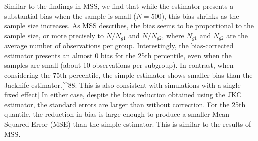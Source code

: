 \documentclass[
  authoryear,
  review,
  1p]{elsarticle}
\begin{document}
Similar to the findings in MSS, we find that while the estimator
presents a substantial bias when the sample is small (\(N=500\)), this
bias shrinks as the sample size increases. As MSS describes, the bias
seems to be proportional to the sample size, or more precisely to
\(N/N_{g1}\) and \(N/N_{g2}\), where \(N_{g1}\) and \(N_{g2}\) are the
average number of observations per group. Interestingly, the
bias-corrected estimator presents an almost 0 bias for the 25th
percentile, even when the samples are small (about 10 observations per
subgroup). In contrast, when considering the 75th percentile, the simple
estimator shows smaller bias than the Jacknife estimator.{[}\^{}88: This
is also consistent with simulations with a single fixed effect{]} In
either case, despite the bias reduction obtained using the JKC
estimator, the standard errors are larger than without correction. For
the 25th quantile, the reduction in bias is large enough to produce a
smaller Mean Squared Error (MSE) than the simple estimator. This is
similar to the results of MSS.
\end{document}
